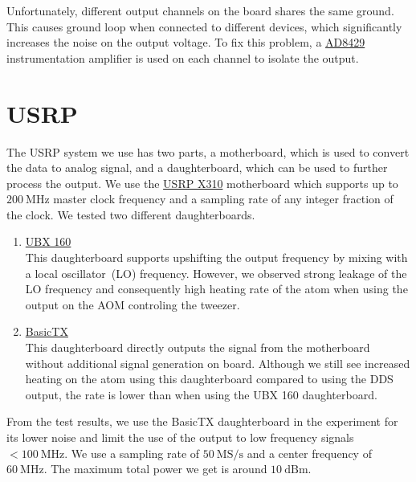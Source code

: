 Unfortunately, different output channels on the board shares the same ground.
This causes ground loop when connected to different devices,
which significantly increases the noise on the output voltage.
To fix this problem, a \href{https://www.analog.com/en/products/ad8429.html}{AD8429}
instrumentation amplifier is used on each channel to isolate the output.

\section{USRP}
\label{appendex:computer-control:usrp}

The USRP system we use has two parts,
a motherboard, which is used to convert the data to analog signal,
and a daughterboard, which can be used to further process the output.
We use the \href{https://www.ettus.com/all-products/x310-kit/}{USRP X310}
motherboard which supports up to $200~\mathrm{MHz}$ master clock frequency
and a sampling rate of any integer fraction of the clock.
We tested two different daughterboards.
\begin{enumerate}
\item \href{https://www.ettus.com/all-products/ubx160/}{UBX 160}\\
  This daughterboard supports upshifting the output frequency
  by mixing with a local oscillator~(LO) frequency.
  However, we observed strong leakage of the LO frequency
  and consequently high heating rate of the atom
  when using the output on the AOM controling the tweezer.
\item \href{https://www.ettus.com/all-products/basictx/}{BasicTX}\\
  This daughterboard directly outputs the signal from the motherboard
  without additional signal generation on board.
  Although we still see increased heating on the atom using this daughterboard
  compared to using the DDS output,
  the rate is lower than when using the UBX 160 daughterboard.
\end{enumerate}
From the test results, we use the BasicTX daughterboard in the experiment
for its lower noise and limit the use of the output
to low frequency signals $<\!100~\mathrm{MHz}$.
We use a sampling rate of $50~\mathrm{MS/s}$ and a center frequency of $60~\mathrm{MHz}$.
The maximum total power we get is around $10~\mathrm{dBm}$.
